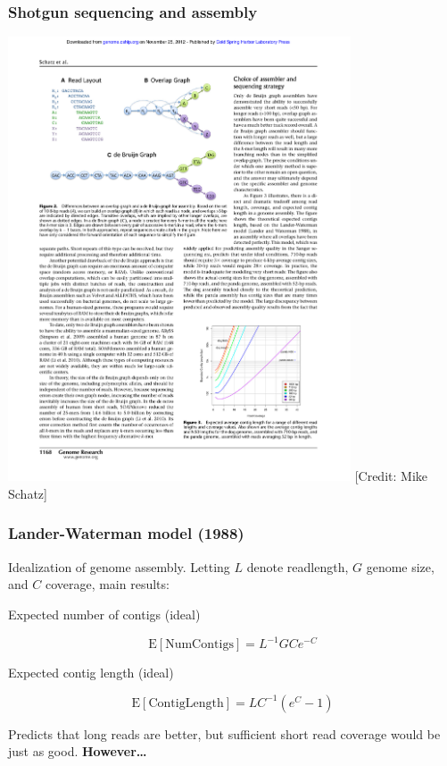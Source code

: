 \documentclass[serif,11pt]{beamer}
\begin{document}
\begin{frame}
\frametitle{Shotgun sequencing and assembly}
\label{sec-4-2}

   \includegraphics[width=4in]{img/overlap-graphs.pdf}
\newline \tiny [Credit: Mike Schatz]
\end{frame}
\begin{frame}
\frametitle{Lander-Waterman model (1988)}
\label{sec-4-3}

   Idealization of genome assembly.  Letting $L$ denote readlength,
   $G$ genome size, and $C$ coverage, main results:
\begin{block}{Expected number of contigs (ideal)}
\label{sec-4-3-1}

    $$\mathrm{E}[\mathrm{NumContigs}]  = L^{-1}GC e^{-C}$$
\end{block}
\begin{block}{Expected contig length (ideal)}
\label{sec-4-3-2}

    $$\mathrm{E}[\mathrm{ContigLength}] = LC^{-1}(e^{C} - 1)$$

    Predicts that long reads are better, but sufficient short read
    coverage would be just as good.  \textbf{However\ldots{}}
\end{block}
\end{frame}
\end{document}
